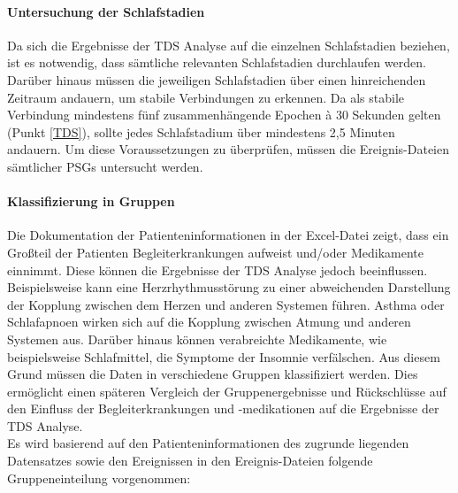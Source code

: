 \paragraph{Untersuchung der Schlafstadien} 
Da sich die Ergebnisse der \acs{TDS} Analyse auf die einzelnen Schlafstadien beziehen, ist es notwendig, dass sämtliche relevanten Schlafstadien durchlaufen werden. Darüber hinaus müssen die jeweiligen Schlafstadien über einen hinreichenden Zeitraum andauern, um stabile Verbindungen zu erkennen. Da als stabile Verbindung mindestens fünf zusammenhängende Epochen \`{a} 30 Sekunden gelten (Punkt \ref{TDS}), sollte jedes Schlafstadium über mindestens 2,5 Minuten andauern. Um diese Voraussetzungen zu überprüfen, müssen die Ereignis-Dateien sämtlicher \acs{PSG}s untersucht werden.

\paragraph{Klassifizierung in Gruppen}
Die Dokumentation der Patienteninformationen in der Excel-Datei zeigt, dass ein Großteil der Patienten Begleiterkrankungen aufweist und/oder Medikamente einnimmt. Diese können die Ergebnisse der \acs{TDS} Analyse jedoch beeinflussen. Beispielsweise kann eine Herzrhythmusstörung zu einer abweichenden Darstellung der Kopplung zwischen dem Herzen und anderen Systemen führen. Asthma oder Schlafapnoen wirken sich auf die Kopplung zwischen Atmung und anderen Systemen aus. Darüber hinaus können verabreichte Medikamente, wie beispielsweise Schlafmittel, die Symptome der Insomnie verfälschen. Aus diesem Grund müssen die Daten in verschiedene Gruppen klassifiziert werden. Dies ermöglicht einen späteren Vergleich der Gruppenergebnisse und Rückschlüsse auf den Einfluss der Begleiterkrankungen und -medikationen auf die Ergebnisse der \acs{TDS} Analyse.\\

Es wird basierend auf den Patienteninformationen des zugrunde liegenden Datensatzes sowie den Ereignissen in den Ereignis-Dateien folgende Gruppeneinteilung vorgenommen:

